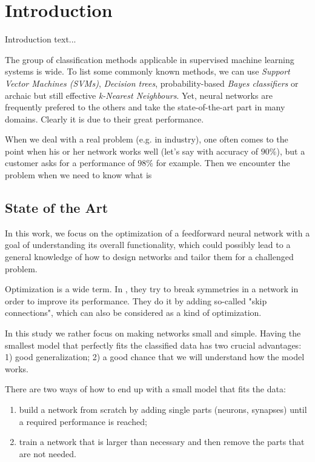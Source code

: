 \chapter{Introduction} \label{chap:introduction}
Introduction text...

\citep{sietsma:why_and_how}
The group of classification methods applicable in supervised machine learning systems is wide. To list some commonly known methods, we can use \textit{Support Vector Machines (SVMs)}, \textit{Decision trees}, probability-based \textit{Bayes classifiers} or archaic but still effective \textit{k-Nearest Neighbours}. Yet, neural networks are frequently prefered to the others and take the state-of-the-art part in many domains. Clearly it is due to their great performance. 

When we deal with a real problem (e.g. in industry), one often comes to the point when his or her network works well (let's say with accuracy of $ 90\% $), but a customer asks for a performance of $ 98\% $ for example. Then we encounter the problem when we need to know what is 

\newpage
\section{State of the Art} \label{sec:state_of_the_art}
In this work, we focus on the optimization of a feedforward neural network with a goal of understanding its overall functionality, which could possibly lead to a general knowledge of how to design networks and tailor them for a challenged problem.

Optimization is a wide term. In \citep{orhan:symmetry}, they try to break symmetries in a network in order to improve its performance. They do it by adding so-called "skip connections", which can also be considered as a kind of optimization.

In this study we rather focus on making networks small and simple. Having the smallest model that perfectly fits the classified data has two crucial advantages: 1) good generalization; 2) a good chance that we will understand how the model works.

There are two ways of how to end up with a small model that fits the data:

\begin{enumerate}
\item build a network from scratch by adding single parts (neurons, synapses) until a required performance is reached;
\item train a network that is larger than necessary and then remove the parts that are not needed.
\end{enumerate}

